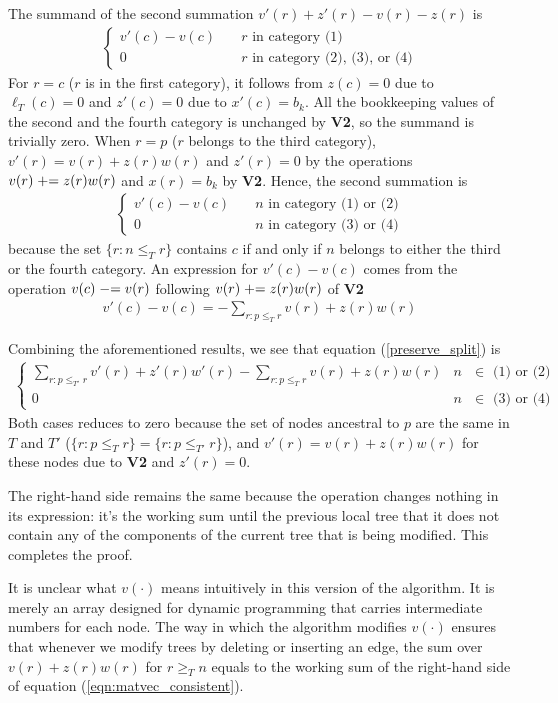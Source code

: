 The summand of the second summation $v'(r) + z'(r) - v(r) - z(r)$ is
\begin{align}
    \begin{cases}
    v'(c) - v(c) & \quad \text{$r$ in category (1)} \\
    0 & \quad  \text{$r$ in category (2), (3), or (4)}
    \end{cases} 
\end{align}
For $r=c$ ($r$ is in the first category), it follows from $z(c)=0$ due to $\ell_T(c)=0$ and $z'(c)=0$ due to $x'(c)=b_k$.
All the bookkeeping values of the second and the fourth category is unchanged by \textbf{V2}, so the summand is trivially zero.
When $r=p$ ($r$ belongs to the third category), $v'(r) = v(r) + z(r)w(r)$  and $z'(r)=0$ by the operations $v(r) \mathrel{+}= z(r)w(r)$ and $x(r)=b_k$ by \textbf{V2}.
Hence, the second summation is
\begin{align}
    \begin{cases}
        v'(c) - v(c) & \quad \text{$n$ in category (1) or (2)} \\
        0 & \quad \text{$n$ in category (3) or (4)}
    \end{cases}
\end{align}
because the set $\{r: n \le_T r\}$ contains $c$ if and only if $n$ belongs to either the third or the fourth category.
An expression for $v'(c)-v(c)$ comes from the operation $v(c) \mathrel{-}= v(r)$ following $v(r) \mathrel{+}= z(r)w(r)$ of \textbf{V2}
\begin{align}
    v'(c) - v(c) = - \sum_{r: p \le_{T} r} v(r) + z(r)w(r)
\end{align}

Combining the aforementioned results, we see that equation (\ref{preserve_split}) is 
\begin{align}
    \begin{cases}
        \sum_{r: p \le_{T'} r} v'(r) + z'(r)w'(r) - \sum_{r: p \le_{T} r} v(r) + z(r)w(r) & \text{$n$ $\in$ (1) or (2)} \\
        0 & \text{$n$ $\in$ (3) or (4)}
    \end{cases} 
\end{align}
Both cases reduces to zero because the set of nodes ancestral to $p$ are the same in $T$ and $T'$ ($\{r: p \le_T r\}=\{r: p \le_{T'} r\}$), 
 and $v'(r) = v(r) + z(r)w(r)$ for these nodes due to \textbf{V2} and $z'(r)=0$. 

The right-hand side remains the same because the operation changes nothing in its expression:
it's the working sum until the previous local tree that it does not contain any of 
the components of the current tree that is being modified.
This completes the proof.

It is unclear what $v(\cdot)$ means intuitively in this version of the algorithm.
It is merely an array designed for dynamic programming
that carries intermediate numbers for each node.
The way in which the algorithm modifies $v(\cdot)$ ensures that whenever we modify trees by deleting or inserting an edge, 
the sum over $v(r)+z(r)w(r)$  for $ r \ge_{T}n $ equals to the working sum of the right-hand side of equation (\ref{eqn:matvec_consistent}).